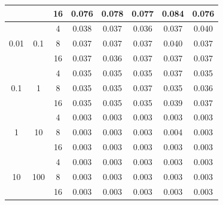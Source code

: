 \begin{table}[H]
\begin{tabular}{ccc|c|c|c|c|c|}
\multicolumn{1}{|c|}{}                      & \multicolumn{1}{c|}{}                      & 16      & 0.076  & 0.078  & 0.077             & 0.084 & 0.076     \\ \hline
\multicolumn{1}{|c|}{\multirow{3}{*}{0.01}} & \multicolumn{1}{c|}{\multirow{3}{*}{0.1}}  & 4       & 0.038  & 0.037  & 0.036             & 0.037 & 0.040     \\ \cline{3-8}
\multicolumn{1}{|c|}{}                      & \multicolumn{1}{c|}{}                      & 8       & 0.037  & 0.037  & 0.037             & 0.040 & 0.037     \\ \cline{3-8}
\multicolumn{1}{|c|}{}                      & \multicolumn{1}{c|}{}                      & 16      & 0.037  & 0.036  & 0.037             & 0.037 & 0.037     \\ \hline
\multicolumn{1}{|c|}{\multirow{3}{*}{0.1}}  & \multicolumn{1}{c|}{\multirow{3}{*}{1}}    & 4       & 0.035  & 0.035  & 0.035             & 0.037 & 0.035     \\ \cline{3-8}
\multicolumn{1}{|c|}{}                      & \multicolumn{1}{c|}{}                      & 8       & 0.035  & 0.035  & 0.037             & 0.035 & 0.036     \\ \cline{3-8}
\multicolumn{1}{|c|}{}                      & \multicolumn{1}{c|}{}                      & 16      & 0.035  & 0.035  & 0.035             & 0.039 & 0.037     \\ \hline
\multicolumn{1}{|c|}{\multirow{3}{*}{1}}    & \multicolumn{1}{c|}{\multirow{3}{*}{10}}   & 4       & 0.003  & 0.003  & 0.003             & 0.003 & 0.003     \\ \cline{3-8}
\multicolumn{1}{|c|}{}                      & \multicolumn{1}{c|}{}                      & 8       & 0.003  & 0.003  & 0.003             & 0.004 & 0.003     \\ \cline{3-8}
\multicolumn{1}{|c|}{}                      & \multicolumn{1}{c|}{}                      & 16      & 0.003  & 0.003  & 0.003             & 0.003 & 0.003     \\ \hline
\multicolumn{1}{|c|}{\multirow{3}{*}{10}}   & \multicolumn{1}{c|}{\multirow{3}{*}{100}}  & 4       & 0.003  & 0.003  & 0.003             & 0.003 & 0.003     \\ \cline{3-8}
\multicolumn{1}{|c|}{}                      & \multicolumn{1}{c|}{}                      & 8       & 0.003  & 0.003  & 0.003             & 0.003 & 0.003     \\ \cline{3-8}
\multicolumn{1}{|c|}{}                      & \multicolumn{1}{c|}{}                      & 16      & 0.003  & 0.003  & 0.003             & 0.003 & 0.003     \\ \hline
\end{tabular}
\label{tbl:measure}
\end{table}

